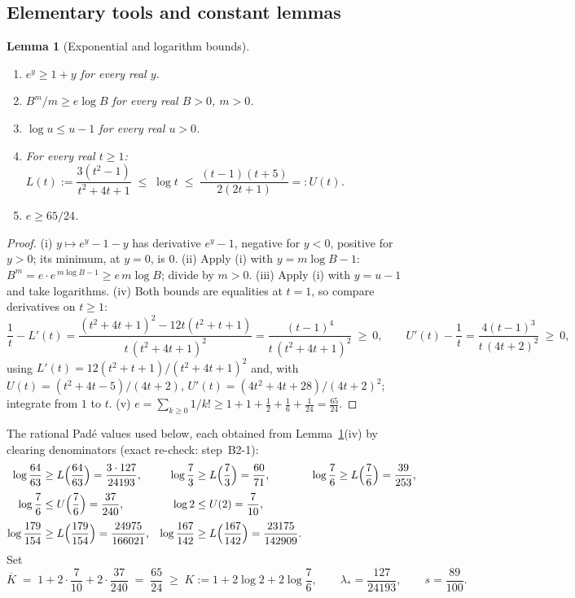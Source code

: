 \documentclass[11pt]{article}
\newtheorem{lemma}[theorem]{Lemma}
\theoremstyle{remark}
\theoremstyle{plain}
\theoremstyle{plain}
\begin{document}
\subsection{Elementary tools and constant lemmas}\label{sec:tools}

\begin{lemma}[Exponential and logarithm bounds]\label{lem:tools}
\begin{enumerate}[label=\textup{(\roman*)}]
\item $e^{y}\ge1+y$ for every real $y$.
\item $B^m/m\ge e\log B$ for every real $B>0$, $m>0$.
\item $\log u\le u-1$ for every real $u>0$.
\item For every real $t\ge1$:
$L(t):=\dfrac{3(t^2-1)}{t^2+4t+1}\;\le\;\log t\;\le\;\dfrac{(t-1)(t+5)}{2(2t+1)}=:U(t)$.
\item $e\ge65/24$.
\end{enumerate}
\end{lemma}

\begin{proof}
(i) $y\mapsto e^y-1-y$ has derivative $e^y-1$, negative for $y<0$, positive for $y>0$; its minimum, at $y=0$, is $0$.
(ii) Apply (i) with $y=m\log B-1$: $B^m=e\cdot e^{\,m\log B-1}\ge e\,m\log B$; divide by $m>0$.
(iii) Apply (i) with $y=u-1$ and take logarithms.
(iv) Both bounds are equalities at $t=1$, so compare derivatives on $t\ge1$:
\[
        \frac{1}{t}-L'(t)
        =\frac{(t^2+4t+1)^2-12t(t^2+t+1)}{t\,(t^2+4t+1)^2}
        =\frac{(t-1)^4}{t\,(t^2+4t+1)^2}\ \ge\ 0,
\qquad
        U'(t)-\frac1t
        =\frac{4(t-1)^3}{t\,(4t+2)^2}\ \ge\ 0,
\]
using $L'(t)=12(t^2+t+1)/(t^2+4t+1)^2$ and, with $U(t)=(t^2+4t-5)/(4t+2)$, $U'(t)=(4t^2+4t+28)/(4t+2)^2$; integrate from $1$ to $t$.
(v) $e=\sum_{k\ge0}1/k!\ge1+1+\frac12+\frac16+\frac1{24}=\frac{65}{24}$.
\end{proof}

The rational Pad\'e values used below, each obtained from Lemma~\ref{lem:tools}(iv) by clearing denominators (exact re-check: step~B2-1):
\begin{equation}\label{eq:pade}
\begin{aligned}
        \log\frac{64}{63}&\ge L\Bigl(\frac{64}{63}\Bigr)=\frac{3\cdot127}{24193},
        &\log\frac73&\ge L\Bigl(\frac73\Bigr)=\frac{60}{71},
        &\log\frac76&\ge L\Bigl(\frac76\Bigr)=\frac{39}{253},
        \\[1mm]
        \log\frac76&\le U\Bigl(\frac76\Bigr)=\frac{37}{240},
        &\log2&\le U(2)=\frac7{10},
        &&
        \\[1mm]
        \log\frac{179}{154}&\ge L\Bigl(\frac{179}{154}\Bigr)=\frac{24975}{166021},
        &\log\frac{167}{142}&\ge L\Bigl(\frac{167}{142}\Bigr)=\frac{23175}{142909}.
        &&
\end{aligned}
\end{equation}
Set
\begin{equation}\label{eq:Kbar}
        \overline K\;=\;1+2\cdot\frac7{10}+2\cdot\frac{37}{240}
        \;=\;\frac{65}{24}
        \;\ge\;K:=1+2\log2+2\log\frac76 ,
        \qquad
        \lambda_*=\frac{127}{24193},
        \qquad
        s=\frac{89}{100}.
\end{equation}
\end{document}

